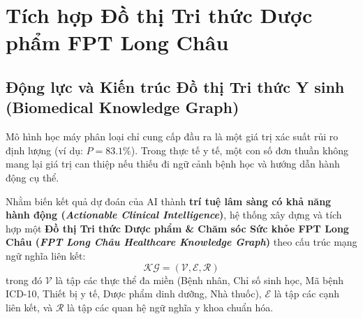 \documentclass[12pt,a4paper]{report}
\begin{document}
\section{Tích hợp Đồ thị Tri thức Dược phẩm FPT Long Châu}

\subsection{Động lực và Kiến trúc Đồ thị Tri thức Y sinh (Biomedical Knowledge Graph)}

Mô hình học máy phân loại chỉ cung cấp đầu ra là một giá trị xác suất rủi ro định lượng (ví dụ: $P=83.1\%$). Trong thực tế y tế, một con số đơn thuần không mang lại giá trị can thiệp nếu thiếu đi ngữ cảnh bệnh học và hướng dẫn hành động cụ thể. 

Nhằm biến kết quả dự đoán của AI thành \textbf{trí tuệ lâm sàng có khả năng hành động (\textit{Actionable Clinical Intelligence})}, hệ thống xây dựng và tích hợp một \textbf{Đồ thị Tri thức Dược phẩm \& Chăm sóc Sức khỏe FPT Long Châu (\textit{FPT Long Châu Healthcare Knowledge Graph})} theo cấu trúc mạng ngữ nghĩa liên kết:
\begin{equation}
\mathcal{KG} = (\mathcal{V}, \mathcal{E}, \mathcal{R})
\end{equation}
trong đó $\mathcal{V}$ là tập các thực thể đa miền (Bệnh nhân, Chỉ số sinh học, Mã bệnh ICD-10, Thiết bị y tế, Dược phẩm dinh dưỡng, Nhà thuốc), $\mathcal{E}$ là tập các cạnh liên kết, và $\mathcal{R}$ là tập các quan hệ ngữ nghĩa y khoa chuẩn hóa.
\end{document}
